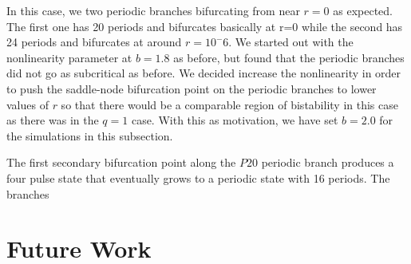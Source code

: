 \documentclass[api,pof,pre,12pt,a4paper]{revtex4-1}
\begin{document}
In this case, we two periodic branches bifurcating from near $r=0$ as expected.  The first one has 20 periods and bifurcates basically at r=0 while the second has 24 periods and bifurcates at around $r=10^-6$.  We started out with the nonlinearity parameter at $b=1.8$ as before, but found that the periodic branches did not go as subcritical as before.  We decided increase the nonlinearity in order to push the saddle-node bifurcation point on the periodic branches to lower values of $r$ so that there would be a comparable region of bistability in this case as there was in the $q=1$ case.  With this as motivation, we have set $b=2.0$ for the simulations in this subsection.         

The first secondary bifurcation point along the $P20$ periodic branch produces a four pulse state that eventually grows to a periodic state with 16 periods. The branches 


\section{Future Work}



\end{document}
